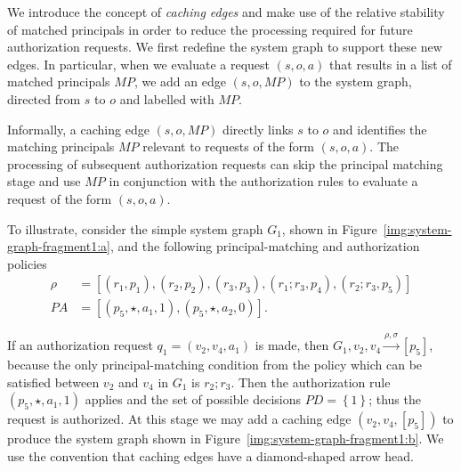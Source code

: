 \documentclass{article}
\newcommand{\set}[1]{\ensuremath{\left\{#1\right\}}} \newcommand{\sett}[1]{\ensuremath{\left\{\textit{#1}\right\}}} \newcommand{\tuple}[1]{\ensuremath{\left(#1\right)}} \newcommand{\tuplet}[1]{\ensuremath{\left(\textit{#1}\right)}}
\newcommand{\comp}{\mathbin{;}}
\newcommand{\pa}{\mathit{PA}}
\renewcommand{\mp}{\mathit{MP}}
\newcommand{\pd}{\mathit{PD}}
\begin{document}
We introduce the concept of \emph{caching edges} and make use of the relative stability of matched principals in order to reduce the processing required for future authorization requests.
We first redefine the system graph to support these new edges.
In particular, when we evaluate a request $(s,o,a)$ that results in a list of matched principals $\mp$, we add an edge $(s,o,\mp)$ to the system graph, directed from $s$ to $o$ and labelled with $\mp$.


Informally, a caching edge $(s,o,\mp)$ directly links $s$ to $o$ and identifies the matching principals $\mp$ relevant to requests of the form $(s,o,a)$.
The processing of subsequent authorization requests can skip the principal matching stage and use $\mp$ in conjunction with the authorization rules to evaluate a request of the form $(s,o,a)$.

To illustrate, consider the simple system graph $G_1$, shown in Figure~\ref{img:system-graph-fragment1:a}, and the following principal-matching and authorization policies
\begin{align*}
 \rho &= [(r_1, p_1),(r_2, p_2),(r_3, p_3),(r_1 \comp r_3, p_4),(r_2 \comp r_3, p_5)] \\
 \pa &= [(p_5,\star,a_1,1),(p_5,\star,a_2,0)].
\end{align*}

If an authorization request $q_1 = (v_2,v_4,a_1)$ is made, then \mbox{$G_1,v_2,v_4 \xrightarrow{\rho,\sigma} [p_5]$}, because the only principal-matching condition from the policy which can be satisfied between $v_2$ and $v_4$ in $G_1$ is $ r_2 \comp r_3$.
Then the authorization rule $(p_5,\star,a_1,1)$ applies and the set of possible decisions $\pd = \set{1}$; thus the request is authorized.
At this stage we may add a caching edge $(v_2,v_4,[p_5])$ to produce the system graph shown in Figure~\ref{img:system-graph-fragment1:b}.
We use the convention that caching edges have a diamond-shaped arrow head.
\end{document}
